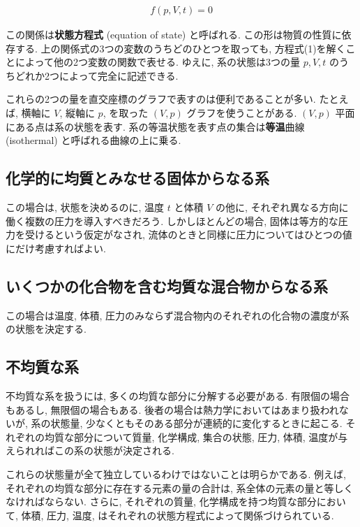 \begin{align}\tag{1}
 f(p,V,t)=0
\end{align}

この関係は\textbf{状態方程式} (equation of state) と呼ばれる. この形は物質の性質に依存する. 上の関係式の3つの変数のうちどのひとつを取っても, 方程式(1)を解くことによって他の2つ変数の関数で表せる. ゆえに, 系の状態は3つの量 $p,V,t$ のうちどれか2つによって完全に記述できる.\par
これらの2つの量を直交座標のグラフで表すのは便利であることが多い. たとえば, 横軸に $V$, 縦軸に $p$, を取った $(V,p)$ グラフを使うことがある. $(V,p)$ 平面にある点は系の状態を表す. 系の等温状態を表す点の集合は\textbf{等温}曲線 (isothermal) と呼ばれる曲線の上に乗る.

\subsection*{化学的に均質とみなせる固体からなる系}
この場合は, 状態を決めるのに, 温度 $t$ と体積 $V$ の他に, それぞれ異なる方向に働く複数の圧力を導入すべきだろう. しかしほとんどの場合, 固体は等方的な圧力を受けるという仮定がなされ, 流体のときと同様に圧力についてはひとつの値にだけ考慮すればよい.

\subsection*{いくつかの化合物を含む均質な混合物からなる系}
この場合は温度, 体積, 圧力のみならず混合物内のそれぞれの化合物の濃度が系の状態を決定する.

\subsection*{不均質な系}
不均質な系を扱うには, 多くの均質な部分に分解する必要がある. 有限個の場合もあるし, 無限個の場合もある. 後者の場合は熱力学においてはあまり扱われないが, 系の状態量, 少なくともそのある部分が連続的に変化するときに起こる. それぞれの均質な部分について質量, 化学構成, 集合の状態, 圧力, 体積, 温度が与えられればこの系の状態が決定される. \par
これらの状態量が全て独立しているわけではないことは明らかである. 例えば, それぞれの均質な部分に存在する元素の量の合計は, 系全体の元素の量と等しくなければならない. さらに, それぞれの質量, 化学構成を持つ均質な部分において, 体積, 圧力, 温度, はそれぞれの状態方程式によって関係づけられている. 

